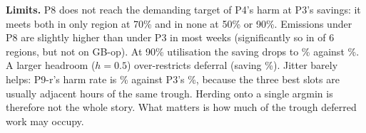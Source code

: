 \textbf{Limits.} P8 does not reach the demanding target of P4's harm at P3's savings: it meets both in
only  region at 70\% and in none at 50\% or 90\%. Emissions under P8 are
slightly higher than under P3 in most weeks (significantly so in
 of 6 regions, but not on GB-op). At 90\% utilisation the saving
drops to \% against
\%. A larger headroom ($h{=}0.5$) over-restricts deferral
(saving \%). Jitter barely helps: P9-r's harm rate is
\% against P3's
\%, because the three best slots are usually adjacent hours
of the same trough. Herding onto a single argmin is therefore not the whole story. What matters is how
much of the trough deferred work may occupy.
